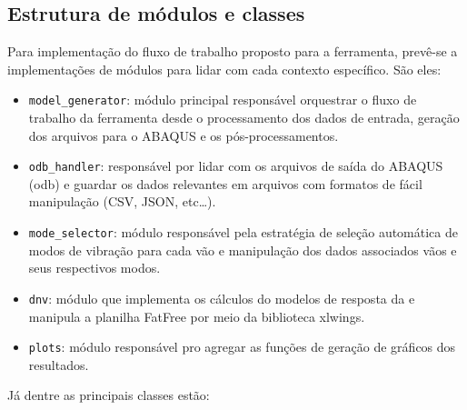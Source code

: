 \subsection{Estrutura de módulos e classes}

Para implementação do fluxo de trabalho proposto para a ferramenta, prevê-se a implementações de módulos para lidar com cada contexto específico. São eles:

\begin{itemize}
    \item \texttt{model\_generator}: módulo principal responsável orquestrar o fluxo de trabalho da ferramenta desde o processamento dos dados de entrada, geração dos arquivos para o ABAQUS e os pós-processamentos.
    
    \item \texttt{odb\_handler}: responsável por lidar com os arquivos de saída do ABAQUS (odb) e guardar os dados relevantes em arquivos com formatos de fácil manipulação (CSV, JSON, etc\ldots).
    
    \item \texttt{mode\_selector}: módulo responsável pela estratégia de seleção automática de modos de vibração para cada vão e manipulação dos dados associados vãos e seus respectivos modos.
    
    \item \texttt{dnv}: módulo que implementa os cálculos do modelos de resposta da  e manipula a planilha FatFree por meio da biblioteca xlwings.
    
    \item \texttt{plots}: módulo responsável pro agregar as funções de geração de gráficos dos resultados.
\end{itemize}

Já dentre as principais classes estão:

